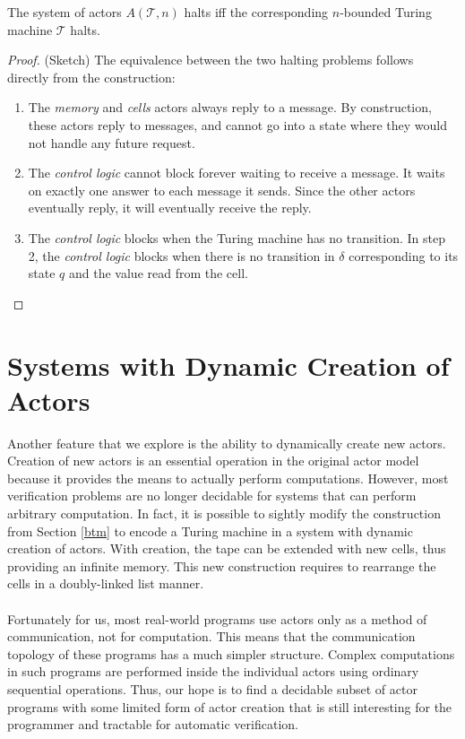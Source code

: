 \documentclass[a4paper]{report}
\numberwithin{algorithm}{chapter}
\begin{document}
\begin{thm}
The system of actors $A(\mathcal{T},n)$ halts iff the corresponding $n$-bounded Turing machine $\mathcal{T}$ halts.
\end{thm}
\begin{proof}(Sketch)
The equivalence between the two halting problems follows directly from the construction:
\begin{enumerate}
\item The \emph{memory} and \emph{cells} actors always reply to a message.
By construction, these actors reply to messages, and cannot go into a state where they would not handle any future request.
\item The \emph{control logic} cannot block forever waiting to receive a message.
It waits on exactly one answer to each message it sends.
Since the other actors eventually reply, it will eventually receive the reply.
\item The \emph{control logic} blocks when the Turing machine has no transition.
In step 2, the \emph{control logic} blocks when there is no transition in $\delta$ corresponding to its state $q$ and the value read from the cell.
\end{enumerate}
\end{proof}

\section{Systems with Dynamic Creation of Actors}

Another feature that we explore is the ability to dynamically create new actors.
Creation of new actors is an essential operation in the original actor model \cite{DBLP:conf/ijcai/HewittBS73,WilliamClinger81,GulAgha86} because it provides the means to actually perform computations.
However, most verification problems are no longer decidable for systems that can perform arbitrary computation.
In fact, it is possible to sightly modify the construction from Section \ref{btm} to encode a Turing machine in a system with dynamic creation of actors.
With creation, the tape can be extended with new cells, thus providing an infinite memory.
This new construction requires to rearrange the cells in a doubly-linked list manner.

\paragraph{}
Fortunately for us, most real-world programs use actors only as a method of communication, not for computation.
This means that the communication topology of these programs has a much simpler structure.
Complex computations in such programs are performed inside the individual actors using ordinary sequential operations.
Thus, our hope is to find a decidable subset of actor programs with some limited form of actor creation that is still interesting for the programmer and tractable for automatic verification.
\end{document}
